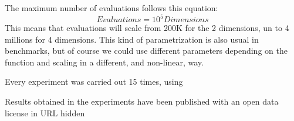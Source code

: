 \documentclass[runningheads]{llncs}
\begin{document}
The maximum number of evaluations follows this equation:
\begin{equation}
    \label{eq:hesitancy-interpretation}
   Evaluations = 10^{5} Dimensions
   \end{equation}
This means that evaluations will scale from 200K for the 2 dimensions,
un to 4 millions for 4 dimensions.  This kind of parametrization is
also usual in benchmarks, but of course we could use different
parameters depending on the function and scaling in a different, and
non-linear, way. 

Every experiment was carried out 15 times, using %

Results obtained in the experiments have been published with an open
data license in {URL hidden}
\end{document}

